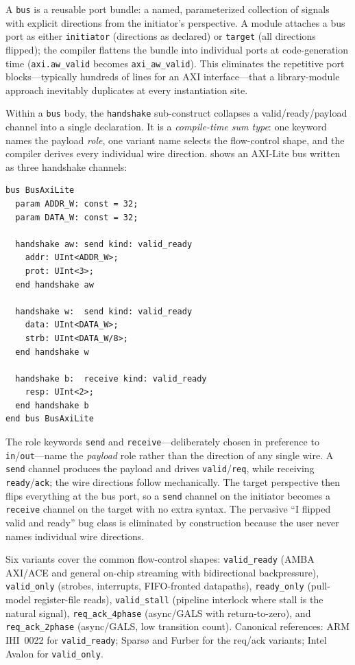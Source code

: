 \documentclass[11pt,twocolumn]{article}
\begin{document}
A \texttt{bus} is a reusable port bundle: a named, parameterized collection of signals with explicit directions from the initiator's perspective. A module attaches a bus port as either \texttt{initiator} (directions as declared) or \texttt{target} (all directions flipped); the compiler flattens the bundle into individual ports at code-generation time (\texttt{axi.aw\_valid} becomes \texttt{axi\_aw\_valid}). This eliminates the repetitive port blocks---typically hundreds of lines for an AXI interface---that a library-module approach inevitably duplicates at every instantiation site.

Within a \texttt{bus} body, the \texttt{handshake} sub-construct collapses a valid/ready/payload channel into a single declaration. It is a \emph{compile-time sum type}: one keyword names the payload \emph{role}, one variant name selects the flow-control shape, and the compiler derives every individual wire direction.  shows an AXI-Lite bus written as three handshake channels:

\begin{lstlisting}[language=Arch,caption={AXI-Lite as three handshake channels},label={lst:handshake}]
bus BusAxiLite
  param ADDR_W: const = 32;
  param DATA_W: const = 32;

  handshake aw: send kind: valid_ready
    addr: UInt<ADDR_W>;
    prot: UInt<3>;
  end handshake aw

  handshake w:  send kind: valid_ready
    data: UInt<DATA_W>;
    strb: UInt<DATA_W/8>;
  end handshake w

  handshake b:  receive kind: valid_ready
    resp: UInt<2>;
  end handshake b
end bus BusAxiLite
\end{lstlisting}

The role keywords \texttt{send} and \texttt{receive}---deliberately chosen in preference to \texttt{in}/\texttt{out}---name the \emph{payload} role rather than the direction of any single wire. A \texttt{send} channel produces the payload and drives \texttt{valid}/\texttt{req}, while receiving \texttt{ready}/\texttt{ack}; the wire directions follow mechanically. The target perspective then flips everything at the bus port, so a \texttt{send} channel on the initiator becomes a \texttt{receive} channel on the target with no extra syntax. The pervasive ``I flipped valid and ready'' bug class is eliminated by construction because the user never names individual wire directions.

Six variants cover the common flow-control shapes: \texttt{valid\_ready} (AMBA AXI/ACE and general on-chip streaming with bidirectional backpressure), \texttt{valid\_only} (strobes, interrupts, FIFO-fronted datapaths), \texttt{ready\_only} (pull-model register-file reads), \texttt{valid\_stall} (pipeline interlock where stall is the natural signal), \texttt{req\_ack\_4phase} (async/GALS with return-to-zero), and \texttt{req\_ack\_2phase} (async/GALS, low transition count). Canonical references: ARM IHI~0022 for \texttt{valid\_ready}; Sparsø and Furber for the req/ack variants; Intel Avalon for \texttt{valid\_only}.
\end{document}
